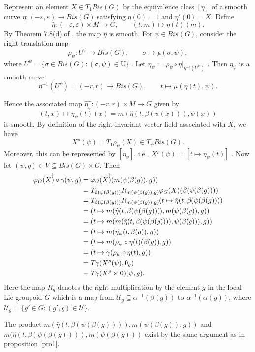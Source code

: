 \documentclass[12pt,a4paper]{amsart}
\makeatletter
\theoremstyle{plain}
\theoremstyle{definition}
\renewenvironment{proof}[1][\proofname]{%
  \par\vspace{0.1em} %
  \pushQED{\qed}%
  \normalfont \topsep0pt \trivlist
  \item[\hskip\labelsep\itshape #1\@addpunct{.}]\ignorespaces
}{%
  \popQED\endtrivlist\@endpefalse
}
\makeatother
\begin{document}
\begin{proof}
   
Represent an element $X\in T_1Bis(G)$ by the equivalence class $[\eta]$ of a smooth curve
$\eta:(-\varepsilon,\varepsilon)\to Bis(G)$ 
satisfying
$\eta(0)=1\,\, \text{and} \,\,
 \eta'(0)=X$.
Define
\[
\hat{\eta}:(-\varepsilon,\varepsilon)\times M\to G,
\qquad
(t,m)\mapsto \eta(t)(m).
\]
By Theorem 7.8(d) of \cite{Schmeding}, the map $\hat{\eta}$ is smooth.
For $\psi\in Bis(G)$, consider the right translation map
\[
\rho_\psi:U^\psi\to Bis(G),
\qquad
\sigma\mapsto \mu(\sigma,\psi),
\]
where $U^\psi
=
\{
\sigma\in Bis(G):
(\sigma,\psi)\in \mathrm U
\}$ .
Let $\eta_\psi:=\rho_\psi\circ \eta|_{\eta^{-1}(U^\psi)}$ .
Then $\eta_\psi$ is a smooth curve
\[
\eta^{-1}(U^{\psi})=(-r,r)\to Bis(G),
\qquad
t\mapsto \mu(\eta(t),\psi).
\]

Hence the associated map
$\widehat{\eta_\psi}:(-r,r)\times M\to G$
given by
\[
(t,x)
\mapsto
\eta_\psi(t)(x)
=
m(\hat{\eta}(t,\beta(\psi(x))),\psi(x))
\]
is smooth.
By definition of the right-invariant vector field associated with $X$, we have
\[
X^\rho(\psi)
=
T_1\rho_\psi(X)
\in
T_\psi Bis(G).
\]
Moreover, this can be represented by $[\eta_{\psi}].$ i.e.,
$X^\rho(\psi)
=
[t\mapsto \eta_\psi(t)]$ .
Now let $(\psi,g)\in V\subseteq Bis(G)\times G$.
Then
\begin{align*}
    \overrightarrow{\varphi_G(X)}\circ\gamma(\psi, g)&=\overrightarrow{\varphi_G(X)}(m(\psi(\beta(g)), g))\\
    &=T_{\tiny{\beta(\psi(\beta(g)))}}R_{\tiny{m(\psi(\beta(g)),g)}}\varphi_G(X)(\beta(\psi(\beta(g))))\\
    &=T_{\tiny{\beta(\psi(\beta(g)))}}R_{\tiny{m(\psi(\beta(g)),g)}}(t \mapsto \hat{\eta}(t, \beta(\psi(\beta(g))))\\
    &=(t \mapsto m(\hat{\eta}(t, \beta(\psi(\beta(g)))), m(\psi(\beta(g)),g))\\
    &= (t \mapsto m(m(\hat{\eta}(t, \beta(\psi(\beta(g)))),\psi(\beta(g))),g))\\
    &= (t \mapsto m(\hat{\eta_\psi}(t,\beta(g)),g))\\
     &= (t \mapsto m(\rho_\psi \circ \eta(t)(\beta(g)),g))\\
  &= (t \mapsto \gamma(\rho_\psi \circ \eta(t),g))\\
  &= T\gamma(X^{\rho}(\psi),0_g)\\
  &= T\gamma(X^{\rho}\times 0)(\psi,g).\\
\end{align*}
Here the map $R_g$ denotes the right multiplication by the element $g$ in the local Lie groupoid $G$ which is a map from $\mathcal{U}_g\subseteq \alpha^{-1}(\beta(g))$ to $\alpha^{-1}(\alpha(g))$, where $\mathcal{U}_g=\{g' \in G: (g',g)\in \mathcal{U}\}$. 

The product $m(\hat{\eta}(t, \beta(\psi(\beta(g)))), m(\psi(\beta(g)),g))$ and $m(\hat{\eta}(t, \beta(\psi(\beta(g)))), m(\psi(\beta(g))) $ 
exist by the same argument as in proposition \ref{pro1}.
\end{proof}
\end{document}
